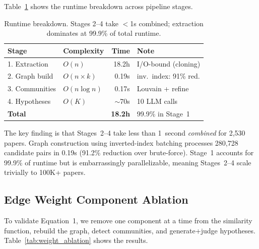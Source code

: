 \documentclass[conference]{IEEEtran}
\begin{document}
Table~\ref{tab:scalability} shows the runtime breakdown across pipeline stages.

\begin{table}[t]
\caption{Runtime breakdown. Stages 2--4 take $<$1s combined; extraction dominates at 99.9\% of total runtime.}
\label{tab:scalability}
\centering
\footnotesize
\begin{tabular}{llrl}
\toprule
\textbf{Stage} & \textbf{Complexity} & \textbf{Time} & \textbf{Note} \\
\midrule
1. Extraction & $O(n)$ & 18.2h & I/O-bound (cloning) \\
2. Graph build & $O(n \!\times\! k)$ & 0.19s & inv.\ index: 91\% red. \\
3. Communities & $O(n \log n)$ & 0.17s & Louvain + refine \\
4. Hypotheses & $O(K)$ & ${\sim}$70s & 10 LLM calls \\
\midrule
\textbf{Total} & & \textbf{18.2h} & 99.9\% in Stage~1 \\
\bottomrule
\end{tabular}
\end{table}

The key finding is that Stages~2--4 take less than 1~second \emph{combined} for 2{,}530 papers.
Graph construction using inverted-index batching processes 280{,}728 candidate pairs in 0.19s (91.2\% reduction over brute-force).
Stage~1 accounts for 99.9\% of runtime but is embarrassingly parallelizable, meaning Stages~2--4 scale trivially to 100K+ papers.


\subsection{Edge Weight Component Ablation}

To validate Equation~1, we remove one component at a time from the similarity function, rebuild the graph, detect communities, and generate+judge hypotheses.
Table~\ref{tab:weight_ablation} shows the results.
\end{document}
